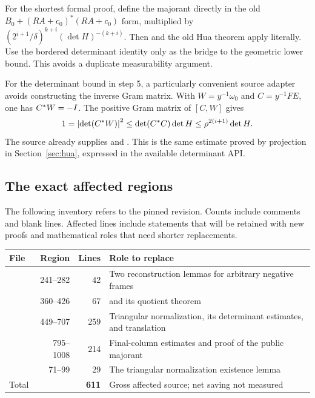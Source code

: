 For the shortest formal proof, define the majorant directly in the old
\(B_0+(RA+c_0)^*(RA+c_0)\) form, multiplied by
\((2^{i+1}/\delta)^{k+i}(\det H)^{-(k+i)}\).
Then  and the old Hua theorem apply
literally. Use the bordered determinant identity only as the bridge to the
geometric lower bound. This avoids a duplicate measurability argument.

For the determinant bound in step 5, a particularly convenient source adapter
avoids constructing the inverse Gram matrix. With
\(W=y^{-1}\omega_0\) and \(C=y^{-1}FE\), one has \(C^*W=-I\).
The positive Gram matrix of \([C,W]\) gives
\[
 1=\left|\det(C^*W)\right|^2\leq\det(C^*C)\det H
       \leq\rho^{2(i+1)}\det H.
\]
The source already supplies  and
. This is the same estimate proved by projection
in Section~\ref{sec:hua}, expressed in the available determinant API.

\subsection{The exact affected regions}

The following inventory refers to the pinned revision. Counts include comments
and blank lines. Affected lines include statements that will be retained with new
proofs and mathematical roles that need shorter replacements.

\begin{center}
\begin{tabularx}{\linewidth}{@{}L{.22\linewidth}rrY@{}}
\toprule
File & Region & Lines & Role to replace\\
\midrule
{} & 241--282 & 42 & Two reconstruction lemmas for arbitrary negative frames\\
 & 360--426 & 67 &  and its quotient theorem\\
 & 449--707 & 259 & Triangular normalization, its determinant estimates, and translation\\
 & 795--1008 & 214 & Final-column estimates and proof of the public majorant\\
 & 71--99 & 29 & The triangular normalization existence lemma\\
\midrule
Total & & \textbf{611} & Gross affected source; net saving not measured\\
\bottomrule
\end{tabularx}
\end{center}

